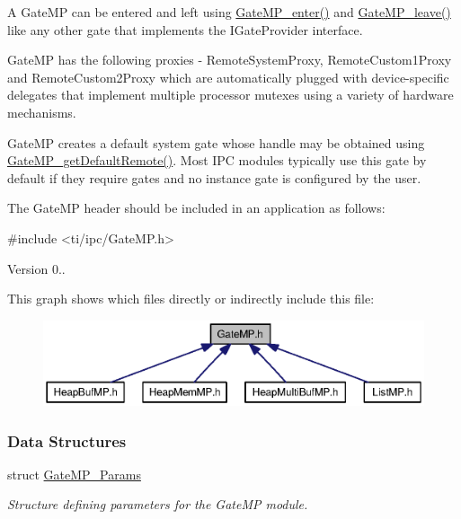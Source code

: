 A Gate\-M\-P can be entered and left using \hyperlink{_gate_m_p_8h_a20a6cab18407f07cb1dbcba48de04cd3}{Gate\-M\-P\-\_\-enter()} and \hyperlink{_gate_m_p_8h_a622c40958deebda445715cd8e8b3ea34}{Gate\-M\-P\-\_\-leave()} like any other gate that implements the I\-Gate\-Provider interface.

Gate\-M\-P has the following proxies -\/ Remote\-System\-Proxy, Remote\-Custom1\-Proxy and Remote\-Custom2\-Proxy which are automatically plugged with device-\/specific delegates that implement multiple processor mutexes using a variety of hardware mechanisms.

Gate\-M\-P creates a default system gate whose handle may be obtained using \hyperlink{_gate_m_p_8h_a6c09c820ed3852840f0ce3036a276687}{Gate\-M\-P\-\_\-get\-Default\-Remote()}. Most I\-P\-C modules typically use this gate by default if they require gates and no instance gate is configured by the user.

The Gate\-M\-P header should be included in an application as follows\-: 
\begin{DoxyCode}
\textcolor{preprocessor}{    #include <ti/ipc/GateMP.h>}
\end{DoxyCode}


\begin{DoxyVersion}{Version}
0.. 


\end{DoxyVersion}
This graph shows which files directly or indirectly include this file\-:
\nopagebreak
\begin{figure}[H]
\begin{center}
\leavevmode
\includegraphics[width=350pt]{_gate_m_p_8h__dep__incl}
\end{center}
\end{figure}
\subsubsection*{Data Structures}
\begin{DoxyCompactItemize}
\item 
struct \hyperlink{struct_gate_m_p___params}{Gate\-M\-P\-\_\-\-Params}
\begin{DoxyCompactList}\small\item\em Structure defining parameters for the Gate\-M\-P module. \end{DoxyCompactList}\end{DoxyCompactItemize}
